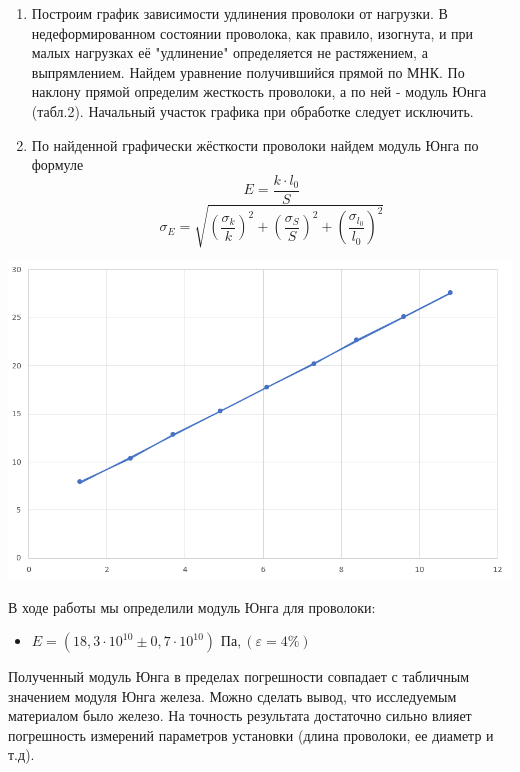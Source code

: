 \documentclass[a4paper, 10pt]{article}%
\begin{document}
\begin{enumerate}
\begin{table}
\caption{Значения k и E}

\end{table}
\item Построим график зависимости удлинения проволоки от нагрузки. В недеформированном состоянии проволока, как правило, изогнута, и при малых нагрузках её "удлинение" определяется не растяжением, а выпрямлением. Найдем уравнение получившийся прямой по МНК. По наклону прямой определим жесткость проволоки, а по ней - модуль Юнга (табл.2). Начальный участок графика при обработке следует исключить. 
\item По найденной графически жёсткости проволоки найдем модуль Юнга по формуле
\[E = \dfrac{k \cdot l_0}{S}\]
\[\sigma_E = \sqrt{\left( \dfrac{\sigma_{k}}{k} \right)^2 + \left( \dfrac{\sigma_{S}}{S} \right)^2 + \left( \dfrac{\sigma_{l_0}}{l_0} \right)^2 }\]
\end{enumerate}

\begin{center}

    \includegraphics[width=1\linewidth]{graph.png}\\
   
\end{center}


\begin{flushleft}
    {
В ходе работы мы определили модуль Юнга для проволоки:
    

\begin{itemize}
	\item \underline{$ E = \left( 18,3 \cdot {10}^{10} \pm 0,7 \cdot {10}^{10} \right) \text{ Па}, \left( \varepsilon = 4 \% \right)   $}
\end{itemize}
Полученный модуль Юнга в пределах погрешности совпадает с табличным значением модуля Юнга железа. Можно сделать вывод, что исследуемым материалом было железо. На точность результата достаточно сильно влияет погрешность измерений параметров установки (длина проволоки, ее диаметр и т.д).
    }
\end{flushleft}
\end{document}
